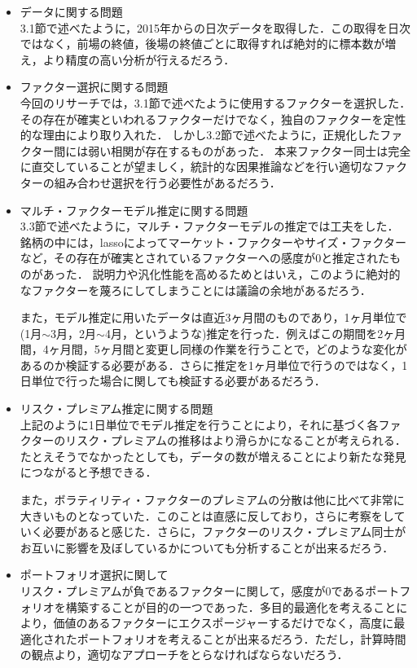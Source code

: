 ﻿\documentclass[11pt]{jreport}
\begin{document}
\begin{itemize}
\item{データに関する問題}\\
\quad 3.1節で述べたように，2015年からの日次データを取得した．この取得を日次ではなく，前場の終値，後場の終値ごとに取得すれば絶対的に標本数が増え，より精度の高い分析が行えるだろう．
\item{ファクター選択に関する問題}\\
\quad 今回のリサーチでは，3.1節で述べたように使用するファクターを選択した．
その存在が確実といわれるファクターだけでなく，独自のファクターを定性的な理由により取り入れた．
しかし3.2節で述べたように，正規化したファクター間には弱い相関が存在するものがあった．
本来ファクター同士は完全に直交していることが望ましく，統計的な因果推論などを行い適切なファクターの組み合わせ選択を行う必要性があるだろう．

\item{マルチ・ファクターモデル推定に関する問題}\\
\quad 3.3節で述べたように，マルチ・ファクターモデルの推定では工夫をした．
銘柄の中には，lassoによってマーケット・ファクターやサイズ・ファクターなど，その存在が確実とされているファクターへの感度が$0$と推定されたものがあった．
説明力や汎化性能を高めるためとはいえ，このように絶対的なファクターを蔑ろにしてしまうことには議論の余地があるだろう．

\quad また，モデル推定に用いたデータは直近3ヶ月間のものであり，1ヶ月単位で(1月$\sim$3月，2月$\sim$4月，というような)推定を行った．例えばこの期間を2ヶ月間，4ヶ月間，5ヶ月間と変更し同様の作業を行うことで，どのような変化があるのか検証する必要がある．さらに推定を1ヶ月単位で行うのではなく，1日単位で行った場合に関しても検証する必要があるだろう．
\item{リスク・プレミアム推定に関する問題}\\
\quad 上記のように1日単位でモデル推定を行うことにより，それに基づく各ファクターのリスク・プレミアムの推移はより滑らかになることが考えられる．
たとえそうでなかったとしても，データの数が増えることにより新たな発見につながると予想できる．

\quad また，ボラティリティ・ファクターのプレミアムの分散は他に比べて非常に大きいものとなっていた．このことは直感に反しており，さらに考察をしていく必要があると感じた．さらに，ファクターのリスク・プレミアム同士がお互いに影響を及ぼしているかについても分析することが出来るだろう．

\item{ポートフォリオ選択に関して}\\
\quad リスク・プレミアムが負であるファクターに関して，感度が0であるポートフォリオを構築することが目的の一つであった．多目的最適化を考えることにより，価値のあるファクターにエクスポージャーするだけでなく，高度に最適化されたポートフォリオを考えることが出来るだろう．ただし，計算時間の観点より，適切なアプローチをとらなければならないだろう．


\end{itemize}
\end{document}
